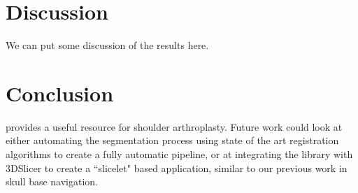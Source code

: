 \section{Discussion}
\label{sec:discussion}
We can put some discussion of the results here.

\section{Conclusion}
\sksglenoid provides a useful resource for shoulder arthroplasty. Future work could look at either 
automating the segmentation process using state of the art registration algorithms \cite{Fu2020} to create a fully automatic pipeline, or at integrating the library with 3DSlicer to create a 
``slicelet" based application, similar to our previous work \cite{PMID:33937966} in skull base 
navigation.

